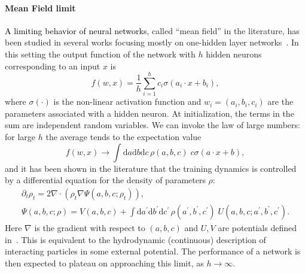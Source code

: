 \documentclass{article}
\newcommand{\mm}[1]{\textcolor{black}{#1}}
\renewcommand{\cite}[1]{\citep{#1}}
\begin{document}
\paragraph{Mean Field limit}
\mm{A limiting behavior of neural networks}, called ``mean field'' in the literature, has been studied in several works focusing mostly on one-hidden layer networks~\cite{mei2018mean,rotskoff2018neural,chizat2018,sirignano2018mean,mei2019mean,nguyen2019mean}. In this setting the output function of the network with $h$ hidden neurons corresponding to an input $x$ is
\begin{equation}
\label{111}
f(w,x) = \frac1h \sum_{i=1}^h c_i \sigma(a_i\cdot x + b_i),
\end{equation}
where $\sigma(\cdot)$ is the non-linear activation function and $w_i=(a_i, b_i, c_i)$ are the parameters associated with a hidden neuron. At initialization, the terms in the sum are independent random variables. We can invoke the law of large numbers: for large $h$ the average tends to the expectation value
\begin{equation}
f(w,x) \to \int\mathrm{d}a \mathrm{d}b \mathrm{d}c\, \rho(a, b, c)\; c \sigma(a \cdot x + b),
\end{equation}
and it has been shown in the literature that the training dynamics is controlled by a differential equation for the density of parameters $\rho$:
\begin{gather}
\partial_t \rho_t = 2 \nabla \cdot (\rho_t \nabla \Psi(a,b,c; \rho_t)),\\
\Psi(a,b,c; \rho) = V(a, b, c) + \int\mathrm{d}a^\prime \mathrm{d}b^\prime \mathrm{d}c^\prime\, \rho(a^\prime, b^\prime, c^\prime)\; U(a,b,c; a^\prime,b^\prime,c^\prime).
\end{gather}
Here $\nabla$ is the gradient with respect to $(a, b, c)$ and $U, V$ are potentials defined in~\cite{mei2018mean}.
This is equivalent to the hydrodynamic (continuous) description of interacting particles in some external potential. The performance of a network is then expected to plateau on approaching this limit, as $h\to\infty$.
\end{document}
